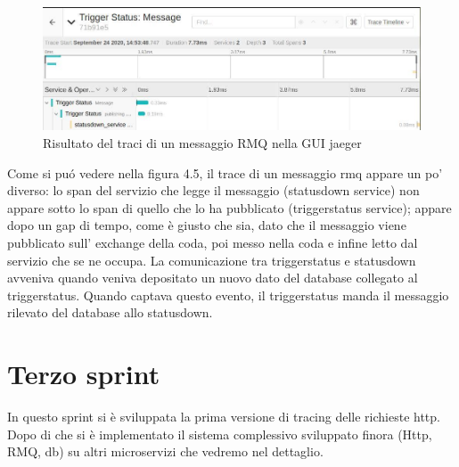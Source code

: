 \documentclass[a4paper,12pt,titlepage,italian,openany]{report}
\begin{document}
\begin{figure}[H]
    \includegraphics[scale=0.5]{45.jpg}
    \centering
    \caption{Risultato del traci di un messaggio RMQ nella GUI jaeger}
\end{figure}
Come si puó vedere nella figura 4.5, il trace di un messaggio rmq appare un po' diverso: lo span del servizio che legge il messaggio (statusdown service) non appare sotto lo span di quello che lo ha pubblicato (triggerstatus service); appare dopo un gap di tempo, come è giusto che sia, dato che il messaggio viene pubblicato sull' exchange della coda, poi messo nella coda e infine letto dal servizio che se ne occupa.
La comunicazione tra triggerstatus e statusdown avveniva quando veniva depositato un nuovo dato del database collegato al triggerstatus. Quando captava questo evento, il triggerstatus manda il messaggio rilevato del database allo statusdown.

\newpage
\section{Terzo sprint}
In questo sprint si è sviluppata la prima versione di tracing delle richieste http. Dopo di che si è implementato il sistema complessivo sviluppato finora (Http, RMQ, db) su altri microservizi che vedremo nel dettaglio.
\end{document}
